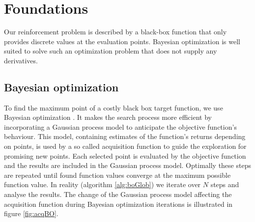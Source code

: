 \chapter{Foundations}
\label{chap:2}

Our reinforcement problem is described by a black-box function that only provides discrete values at the evaluation points. Bayesian optimization is well suited to solve such an optimization problem that does not supply any derivatives.

\section{Bayesian optimization}


To find the maximum point of a costly black box target function, we use Bayesian optimization \cite{brochu2010tutorial,shahriari2016taking,lizotte2008practical}. It makes the search process more efficient by incorporating a Gaussian process model to anticipate the objective function's behaviour. This model, containing estimates of the function's returns depending on points, is used by a so called acquisition function to guide the exploration for promising new points. Each selected point is evaluated by the objective function and the results are included in the Gaussian process model. Optimally these steps are repeated until found function values converge at the maximum possible function value. In reality (algorithm \ref{alg:boGlob}) we iterate over $N$ steps and analyse the results. The change of the Gaussian process model affecting the acquisition function during Bayesian optimization iterations is illustrated in figure \ref{fig:acqBO}.\\

